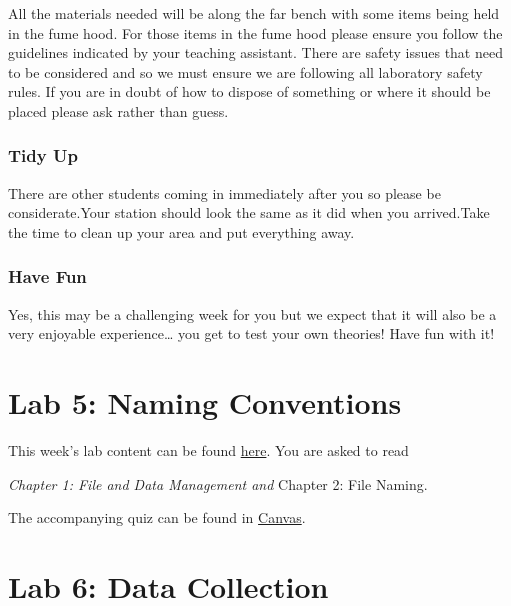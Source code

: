 \documentclass[
]{book}
\begin{document}
All the materials needed will be along the far bench with some items being held in the fume hood. For those items in the fume hood please ensure you follow the guidelines indicated by your teaching assistant. There are safety issues that need to be considered and so we must ensure we are following all laboratory safety rules. If you are in doubt of how to dispose of something or where it should be placed please ask rather than guess.

\hypertarget{tidy-up}{%
\subsection*{Tidy Up}\label{tidy-up}}

There are other students coming in immediately after you so please be considerate.Your station should look the same as it did when you arrived.Take the time to clean up your area and put everything away.

\hypertarget{have-fun}{%
\subsection*{Have Fun}\label{have-fun}}

Yes, this may be a challenging week for you but we expect that it will also be a very enjoyable experience\ldots{} you get to test your own theories! Have fun with it!

\hypertarget{lab-5-naming-conventions}{%
\chapter*{Lab 5: Naming Conventions}\label{lab-5-naming-conventions}}

This week's lab content can be found \href{https://ubco-biology.github.io/Procedures-and-Guidelines/file-and-data-management.html}{here}. You are asked to read

\emph{Chapter 1: File and Data Management and
} Chapter 2: File Naming.

The accompanying quiz can be found in \href{https://canvas.ubc.ca}{Canvas}.

\hypertarget{lab-6-data-collection}{%
\chapter*{Lab 6: Data Collection}\label{lab-6-data-collection}}
\end{document}
